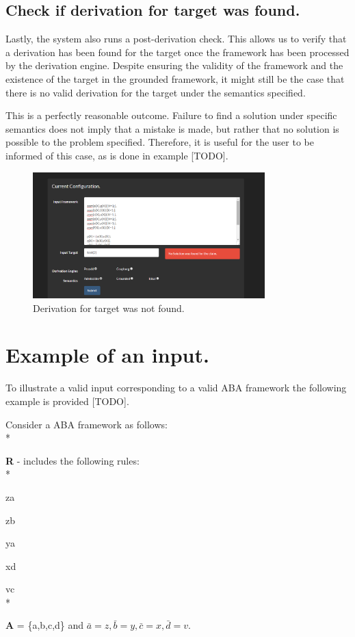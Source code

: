 \subsection{Check if derivation for target was found.}

Lastly, the system also runs a post-derivation check. This allows us to verify that a derivation has been found for the target once the framework has been processed by the derivation engine. Despite ensuring the validity of the framework and the existence of the target in the grounded framework, it might still be the case that there is no valid derivation for the target under the semantics specified.

This is a perfectly reasonable outcome. Failure to find a solution under specific semantics does not imply that a mistake is made, but rather that no solution is possible to the problem specified. Therefore, it is useful for the user to be informed of this case, as is done in example [TODO].

\clearpage

\begin{figure}[h]
    \centering
    \includegraphics[width=0.8\textwidth]{inputSolNotFound.png}
    \caption{Derivation for target was not found.}
    \label{fig:sol_not_found}
\end{figure}

\section{Example of an input.}

To illustrate a valid input corresponding to a valid ABA framework the following example is provided [TODO].

\begin{framed}
\begin{exmp} Consider a ABA framework as follows:
\\*

\noindent\textbf{R} - includes the following rules:
\\*

\indent	z\textleftarrow a

\indent z\textleftarrow b

\indent y\textleftarrow a

\indent x\textleftarrow d

\indent v\textleftarrow c
\\*

\noindent\textbf{A} = \{a,b,c,d\} and $\bar{a} = z, \bar{b} = y, \bar{c} = x, \bar{d} = v$.

\end{exmp}
\end{framed}


